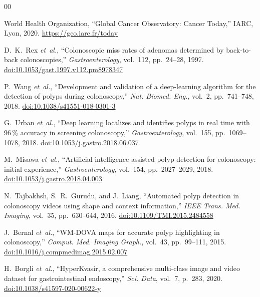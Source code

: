 \documentclass[conference]{IEEEtran}
\begin{document}
\begin{thebibliography}{00}

World Health Organization, ``Global Cancer Observatory: Cancer Today,''
IARC, Lyon, 2020. \url{https://gco.iarc.fr/today}

D.~K.~Rex \emph{et~al.}, ``Colonoscopic miss rates of adenomas determined by
back-to-back colonoscopies,'' \textit{Gastroenterology}, vol.~112, pp.~24--28,
1997.
\href{https://doi.org/10.1053/gast.1997.v112.pm8978347}{doi:10.1053/gast.1997.v112.pm8978347}

P.~Wang \emph{et~al.}, ``Development and validation of a deep-learning
algorithm for the detection of polyps during colonoscopy,''
\textit{Nat. Biomed. Eng.}, vol.~2, pp.~741--748, 2018.
\href{https://doi.org/10.1038/s41551-018-0301-3}{doi:10.1038/s41551-018-0301-3}

G.~Urban \emph{et~al.}, ``Deep learning localizes and identifies polyps in
real time with 96\,\% accuracy in screening colonoscopy,''
\textit{Gastroenterology}, vol.~155, pp.~1069--1078, 2018.
\href{https://doi.org/10.1053/j.gastro.2018.06.037}{doi:10.1053/j.gastro.2018.06.037}

M.~Misawa \emph{et~al.}, ``Artificial intelligence-assisted polyp detection
for colonoscopy: initial experience,''
\textit{Gastroenterology}, vol.~154, pp.~2027--2029, 2018.
\href{https://doi.org/10.1053/j.gastro.2018.04.003}{doi:10.1053/j.gastro.2018.04.003}

N.~Tajbakhsh, S.~R.~Gurudu, and J.~Liang, ``Automated polyp detection in
colonoscopy videos using shape and context information,''
\textit{IEEE Trans. Med. Imaging}, vol.~35, pp.~630--644, 2016.
\href{https://doi.org/10.1109/TMI.2015.2484558}{doi:10.1109/TMI.2015.2484558}

J.~Bernal \emph{et~al.}, ``WM-DOVA maps for accurate polyp highlighting in
colonoscopy,'' \textit{Comput. Med. Imaging Graph.}, vol.~43, pp.~99--111, 2015.
\href{https://doi.org/10.1016/j.compmedimag.2015.02.007}{doi:10.1016/j.compmedimag.2015.02.007}

H.~Borgli \emph{et~al.}, ``HyperKvasir, a comprehensive multi-class image
and video dataset for gastrointestinal endoscopy,''
\textit{Sci. Data}, vol.~7, p.~283, 2020.
\href{https://doi.org/10.1038/s41597-020-00622-y}{doi:10.1038/s41597-020-00622-y}


\end{thebibliography}
\end{document}
